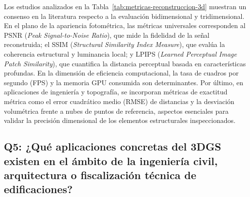 \documentclass[12pt,oneside]{report}
\begin{document}
Los estudios analizados en la Tabla~\ref{tab:metricas-reconstruccion-3d} muestran un consenso en la literatura respecto a la evaluación bidimensional y tridimensional. En el plano de la apariencia fotométrica, las métricas universales corresponden al PSNR (\textit{Peak Signal-to-Noise Ratio}), que mide la fidelidad de la señal reconstruida; el SSIM (\textit{Structural Similarity Index Measure}), que evalúa la coherencia estructural y luminancia local; y LPIPS (\textit{Learned Perceptual Image Patch Similarity}), que cuantifica la distancia perceptual basada en características profundas. En la dimensión de eficiencia computacional, la tasa de cuadros por segundo (FPS) y la memoria GPU consumida son determinantes. Por último, en aplicaciones de ingeniería y topografía, se incorporan métricas de exactitud métrica como el error cuadrático medio (RMSE) de distancias y la desviación volumétrica frente a nubes de puntos de referencia, aspectos esenciales para validar la precisión dimensional de los elementos estructurales inspeccionados.\par

\subsection{Q5: ¿Qué aplicaciones concretas del 3DGS existen en el ámbito de la ingeniería civil, arquitectura o fiscalización técnica de edificaciones?}
\end{document}
